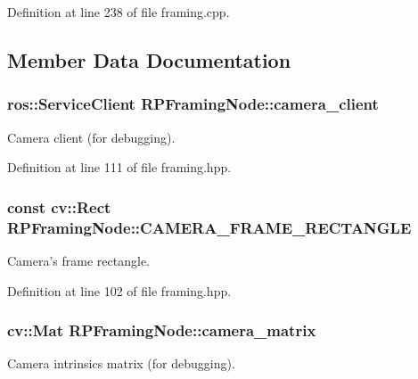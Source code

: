 \-Definition at line 238 of file framing.\-cpp.



\subsection{\-Member \-Data \-Documentation}
\hypertarget{class_r_p_framing_node_aedaa9ec0ee3cf711f893fbe242ebc5a8}{
\subsubsection[{camera\-\_\-client}]{\setlength{\rightskip}{0pt plus 5cm}ros\-::\-Service\-Client {\bf \-R\-P\-Framing\-Node\-::camera\-\_\-client}}}\label{class_r_p_framing_node_aedaa9ec0ee3cf711f893fbe242ebc5a8}
\-Camera client (for debugging). 

\-Definition at line 111 of file framing.\-hpp.

\hypertarget{class_r_p_framing_node_a6773f17e9534cc005d5a3f2b749e3e72}{
\subsubsection[{\-C\-A\-M\-E\-R\-A\-\_\-\-F\-R\-A\-M\-E\-\_\-\-R\-E\-C\-T\-A\-N\-G\-L\-E}]{\setlength{\rightskip}{0pt plus 5cm}const cv\-::\-Rect {\bf \-R\-P\-Framing\-Node\-::\-C\-A\-M\-E\-R\-A\-\_\-\-F\-R\-A\-M\-E\-\_\-\-R\-E\-C\-T\-A\-N\-G\-L\-E}}}\label{class_r_p_framing_node_a6773f17e9534cc005d5a3f2b749e3e72}
\-Camera's frame rectangle. 

\-Definition at line 102 of file framing.\-hpp.

\hypertarget{class_r_p_framing_node_a4a7d5d460e11aece880b5e9836d149dc}{
\subsubsection[{camera\-\_\-matrix}]{\setlength{\rightskip}{0pt plus 5cm}cv\-::\-Mat {\bf \-R\-P\-Framing\-Node\-::camera\-\_\-matrix}}}\label{class_r_p_framing_node_a4a7d5d460e11aece880b5e9836d149dc}
\-Camera intrinsics matrix (for debugging). 

